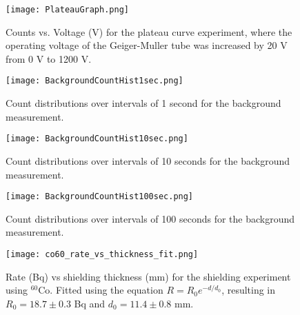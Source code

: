 \begin{figure}[H]
	\centering
	\texttt{[image: PlateauGraph.png]}
	\caption{Counts vs. Voltage (V) for the plateau curve experiment, where the operating voltage of the Geiger-Muller tube was increased by 20 V from 0 V to 1200 V.}
\end{figure}

\begin{figure}[H]
	\centering
	\texttt{[image: BackgroundCountHist1sec.png]}
	\caption{Count distributions over intervals of 1 second for the background measurement.}
\end{figure}

\begin{figure}[H]
	\centering
	\texttt{[image: BackgroundCountHist10sec.png]}
	\caption{Count distributions over intervals of 10 seconds for the background measurement.}
\end{figure}

\begin{figure}[H]
	\centering
	\texttt{[image: BackgroundCountHist100sec.png]}
	\caption{Count distributions over intervals of 100 seconds for the background measurement.}
\end{figure}

\begin{table}[H]
    \centering
     \label{tab:at} 
    
\end{table}

\begin{figure}[H]
	\centering
	\texttt{[image: co60\_rate\_vs\_thickness\_fit.png]}
	\caption{Rate (Bq) vs shielding thickness (mm) for the shielding experiment using $^{60}$Co. Fitted using the equation $R = R_0 e^{-d/d_0}$, resulting in $R_0 = 18.7 \pm 0.3$ Bq and $d_0 = 11.4 \pm 0.8$ mm.}
\end{figure}

\pagebreak



